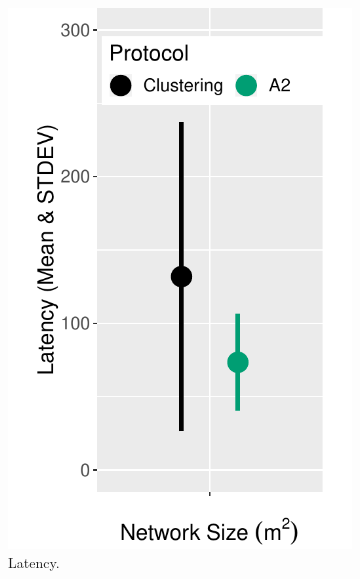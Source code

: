 \begin{figure}[bt]
    \centering
        \begin{subfigure}{0.32\textwidth}
        \centering
        \includegraphics[width=\textwidth, keepaspectratio]{figure/Results/ChaosComparison/Flocklab/FlocklabComparison_Latency.pdf}
        \caption{Latency.}
        \label{subfig:flocklab-latency}
    \end{subfigure}
    \hfill
    \begin{subfigure}{0.32\textwidth}
        \centering

\end{subfigure}
\end{figure}

